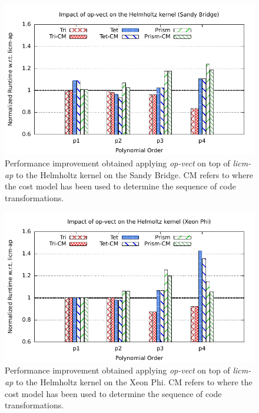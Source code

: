 \documentclass[conference]{IEEEtran}
\begin{document}
\begin{figure}[h]
\begin{center}
\includegraphics[scale=0.65]{Pictures/helmholtz-normalized-opvect.pdf}
\end{center}
\caption{Performance improvement obtained applying \emph{op-vect} on top of \emph{licm-ap} to the Helmholtz kernel on the Sandy Bridge. CM refers to where the cost model has been used to determine the sequence of code transformations.}
\label{fig:opvect-helmholtz-speedup}
\end{figure}

\begin{figure}[h]
\begin{center}
\includegraphics[scale=0.65]{Pictures/helmholtz-normalized-opvect-phi.pdf}
\end{center}
\caption{Performance improvement obtained applying \emph{op-vect} on top of \emph{licm-ap} to the Helmholtz kernel on the Xeon Phi. CM refers to where the cost model has been used to determine the sequence of code transformations.}
\label{fig:opvect-helmholtz-speedup-phi}
\end{figure}
\end{document}
